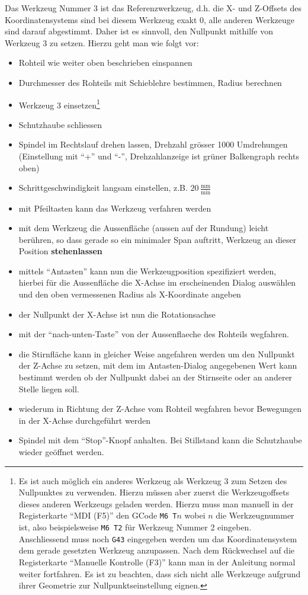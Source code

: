 \documentclass{\basedir/fablab-document}
\begin{document}
Das Werkzeug Nummer 3 ist das Referenzwerkzeug, d.h. die X- und Z-Offsets des Koordinatensystems sind bei diesem Werkzeug exakt $0$, alle anderen Werkzeuge sind darauf abgestimmt. Daher ist es sinnvoll, den Nullpunkt mithilfe von Werkzeug 3 zu setzen. Hierzu geht man wie folgt vor:
\begin{itemize}
	\item Rohteil wie weiter oben beschrieben einspannen
	\item Durchmesser des Rohteils mit Schieblehre bestimmen, Radius berechnen
	\item Werkzeug 3 einsetzen\footnote{Es ist auch möglich ein anderes Werkzeug als Werkzeug 3 zum Setzen des Nullpunktes zu verwenden. Hierzu müssen aber zuerst die Werkzeugoffsets dieses anderen Werkzeugs geladen werden. Hierzu muss man manuell in der Registerkarte \enquote{MDI (F5)} den GCode \texttt{M6 T$n$} wobei $n$ die Werkzeugnummer ist, also beispielsweise \texttt{M6 T2} für Werkzeug Nummer 2 eingeben. Anschliessend muss noch \texttt{G43} eingegeben werden um das Koordinatensystem dem gerade gesetzten Werkzeug anzupassen. Nach dem Rückwechsel auf die Registerkarte \enquote{Manuelle Kontrolle (F3)} kann man in der Anleitung normal weiter fortfahren. Es ist zu beachten, dass sich nicht alle Werkzeuge aufgrund ihrer Geometrie zur Nullpunktseinstellung eignen.}
	\item Schutzhaube schliessen
	\item Spindel im Rechtslauf drehen lassen, Drehzahl grösser 1000 Umdrehungen (Einstellung mit \enquote{+} und \enquote{-}, Drehzahlanzeige ist grüner Balkengraph rechts oben)
	\item Schrittgeschwindigkeit langsam einstellen, z.B. $20\,\frac{\mathrm{mm}}{\mathrm{min}}$
	\item mit Pfeiltasten kann das Werkzeug verfahren werden
	\item mit dem Werkzeug die Aussenfläche (aussen auf der Rundung) leicht berühren, so dass gerade so ein minimaler Span auftritt, Werkzeug an dieser Position \textbf{stehenlassen}
	\item mittels \enquote{Antasten} kann nun die Werkzeugposition spezifiziert werden, hierbei für die Aussenfläche die X-Achse im erscheinenden Dialog auswählen und den oben vermessenen Radius als X-Koordinate angeben
	\item der Nullpunkt der X-Achse ist nun die Rotationsachse
	\item mit der \enquote{nach-unten-Taste} von der Aussenflaeche des Rohteils wegfahren.
	\item die Stirnfläche kann in gleicher Weise angefahren werden um den Nullpunkt der Z-Achse zu setzen, mit dem im Antasten-Dialog angegebenen Wert kann bestimmt werden ob der Nullpunkt dabei an der Stirnseite oder an anderer Stelle liegen soll.
	\item wiederum in Richtung der Z-Achse vom Rohteil wegfahren bevor Bewegungen in der X-Achse durchgeführt werden
	\item Spindel mit dem \enquote{Stop}-Knopf anhalten. Bei Stillstand kann die Schutzhaube wieder geöffnet werden.
\end{itemize}
\end{document}

